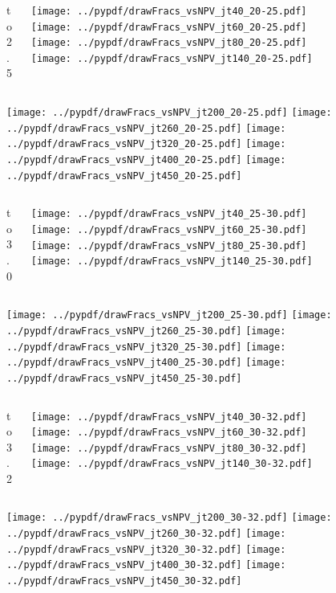 \documentclass[aspectratio=169]{beamer}
\begin{document}
\begin{figure}[p]
\flushleft
\begin{columns}[T]
\begin{column}{.2\linewidth}
 to 2.5
\end{column}
\begin{column}{.8\linewidth}
\texttt{[image: ../pypdf/drawFracs\_vsNPV\_jt40\_20-25.pdf]}
\texttt{[image: ../pypdf/drawFracs\_vsNPV\_jt60\_20-25.pdf]}
\texttt{[image: ../pypdf/drawFracs\_vsNPV\_jt80\_20-25.pdf]}
\texttt{[image: ../pypdf/drawFracs\_vsNPV\_jt140\_20-25.pdf]}
\end{column}
\end{columns}
\texttt{[image: ../pypdf/drawFracs\_vsNPV\_jt200\_20-25.pdf]}
\texttt{[image: ../pypdf/drawFracs\_vsNPV\_jt260\_20-25.pdf]}
\texttt{[image: ../pypdf/drawFracs\_vsNPV\_jt320\_20-25.pdf]}
\texttt{[image: ../pypdf/drawFracs\_vsNPV\_jt400\_20-25.pdf]}
\texttt{[image: ../pypdf/drawFracs\_vsNPV\_jt450\_20-25.pdf]}
\end{figure}

\begin{figure}[p]
\flushleft
\begin{columns}[T]
\begin{column}{.2\linewidth}
 to 3.0
\end{column}
\begin{column}{.8\linewidth}
\texttt{[image: ../pypdf/drawFracs\_vsNPV\_jt40\_25-30.pdf]}
\texttt{[image: ../pypdf/drawFracs\_vsNPV\_jt60\_25-30.pdf]}
\texttt{[image: ../pypdf/drawFracs\_vsNPV\_jt80\_25-30.pdf]}
\texttt{[image: ../pypdf/drawFracs\_vsNPV\_jt140\_25-30.pdf]}
\end{column}
\end{columns}
\texttt{[image: ../pypdf/drawFracs\_vsNPV\_jt200\_25-30.pdf]}
\texttt{[image: ../pypdf/drawFracs\_vsNPV\_jt260\_25-30.pdf]}
\texttt{[image: ../pypdf/drawFracs\_vsNPV\_jt320\_25-30.pdf]}
\texttt{[image: ../pypdf/drawFracs\_vsNPV\_jt400\_25-30.pdf]}
\texttt{[image: ../pypdf/drawFracs\_vsNPV\_jt450\_25-30.pdf]}
\end{figure}

\begin{figure}[p]
\flushleft
\begin{columns}[T]
\begin{column}{.2\linewidth}
 to 3.2
\end{column}
\begin{column}{.8\linewidth}
\texttt{[image: ../pypdf/drawFracs\_vsNPV\_jt40\_30-32.pdf]}
\texttt{[image: ../pypdf/drawFracs\_vsNPV\_jt60\_30-32.pdf]}
\texttt{[image: ../pypdf/drawFracs\_vsNPV\_jt80\_30-32.pdf]}
\texttt{[image: ../pypdf/drawFracs\_vsNPV\_jt140\_30-32.pdf]}
\end{column}
\end{columns}
\texttt{[image: ../pypdf/drawFracs\_vsNPV\_jt200\_30-32.pdf]}
\texttt{[image: ../pypdf/drawFracs\_vsNPV\_jt260\_30-32.pdf]}
\texttt{[image: ../pypdf/drawFracs\_vsNPV\_jt320\_30-32.pdf]}
\texttt{[image: ../pypdf/drawFracs\_vsNPV\_jt400\_30-32.pdf]}
\texttt{[image: ../pypdf/drawFracs\_vsNPV\_jt450\_30-32.pdf]}
\end{figure}
\end{document}
